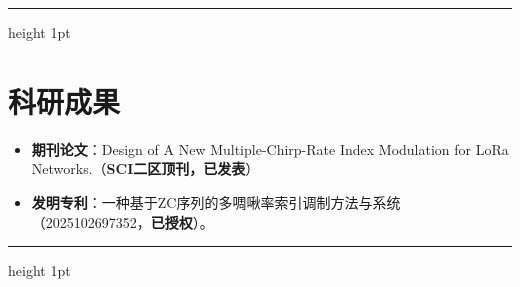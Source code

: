 \documentclass[11pt,a4paper]{article}
\begin{document}
	\vspace{1mm}
	\hrule height 1pt
	\vspace{1mm}
	

	
	\section*{\textnormal{\textbf{科研成果}}}
	\begin{itemize}
		\item \textbf{期刊论文}：Design of A New Multiple-Chirp-Rate Index Modulation for LoRa Networks.（\textbf{SCI二区顶刊，已发表}）
		\item \textbf{发明专利}：一种基于ZC序列的多啁啾率索引调制方法与系统（2025102697352，\textbf{已授权}）。

	\end{itemize}
	
	\vspace{1mm}
	\hrule height 1pt
	\vspace{1mm}
	
\end{document}
